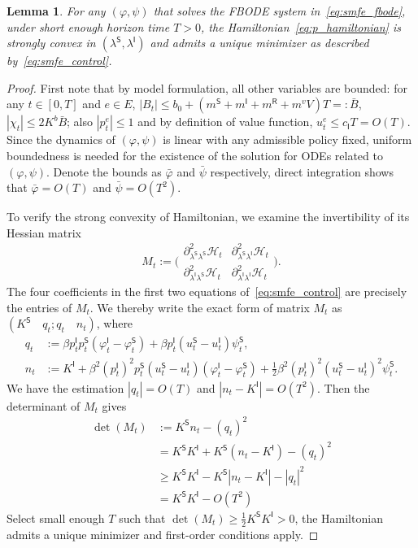\documentclass[letterpaper, 10 pt, conference]{ieeeconf}  %
\def\sS{\mathsf{S}}
\def\sI{\mathsf{I}}
\def\sR{\mathsf{R}}
\newtheorem{lemma}[theorem]{Lemma}
\begin{document}
\begin{lemma}
    \label{lemma:h_convexity}
    For any $(\varphi, \psi)$ that solves the FBODE system in~\eqref{eq:smfe_fbode}, under short enough horizon time $T > 0$, the Hamiltonian~\eqref{eq:p_hamiltonian} is strongly convex in $(\lambda^\sS,\lambda^\sI)$ and admits a unique minimizer as described by~\eqref{eq:smfe_control}.
\end{lemma}
\begin{proof}
    First note that by model formulation, all other variables are bounded: for any $t \in [0,T]$ and $e \in E$, $|B_t| \leq b_0+(m^\sS+m^\sI+m^\sR+m^v V)T =: \bar{B}$, $|\chi_t| \leq 2 K^b \bar{B}$; also $|p_t^e| \leq 1$ and by definition of value function, $u_t^e \leq c_\sI T = O(T)$.  Since the dynamics of $(\varphi,\psi)$ is linear with any admissible policy fixed, uniform boundedness is needed for the existence of the solution for ODEs related to $(\varphi,\psi)$. Denote the bounds as $\bar\varphi$ and $\bar\psi$ respectively, direct integration shows that $\bar\varphi = O(T)$ and $\bar\psi = O(T^2)$.

    To verify the strong convexity of Hamiltonian, we examine the invertibility of its Hessian matrix
    \small $$M_t:=\bigg(\begin{array}{cc}
\partial^2_{\lambda^{\sS}\lambda^{\sS}} \mathcal{H}_t & \partial^2_{\lambda^{\sS}\lambda^{\sI}} \mathcal{H}_t \\
\partial^2_{\lambda^{\sI}\lambda^{\sS}} \mathcal{H}_t & \partial^2_{\lambda^{\sI}\lambda^{\sI}} \mathcal{H}_t
\end{array}\bigg).$$ \normalsize
The four coefficients in the first two equations of~\eqref{eq:smfe_control} are precisely the entries of $M_t$.
    We thereby write the exact form of matrix $M_t$ as $(K^\sS \quad q_t; q_t \quad n_t)$, where
    \small
    \begin{equation*}
        \begin{aligned}
            q_t &:= \beta p_t^\sI p_t^\sS(\varphi_t^\sI-\varphi_t^\sS)+\beta p_t^\sI(u_t^\sS-u_t^\sI) \psi_t^\sS, \\
            n_t &:= K^\sI + \beta^2 (p_t^\sI)^2 p_t^\sS (u_t^\sS-u_t^\sI)(\varphi_t^\sI-\varphi_t^\sS) +\frac{1}{2}\beta^2 (p_t^\sI)^2(u_t^\sS-u_t^\sI)^2 \psi_t^\sS.
        \end{aligned}
    \end{equation*}
    \normalsize
    We have the estimation $|q_t| = O(T)$ and $|n_t - K^\sI| = O(T^2)$. Then the determinant of $M_t$ gives
    \small
    \begin{equation*}
        \begin{aligned}
            \det(M_t)&:=K^\sS n_t - (q_t)^2 \\ &= K^\sS K^\sI + K^\sS (n_t - K^\sI) - (q_t)^2 \\ &\geq K^\sS K^\sI - K^\sS |n_t - K^\sI| - |q_t|^2 \\ & = K^\sS K^\sI - O(T^2)
        \end{aligned}
    \end{equation*}
    \normalsize
    Select small enough $T$ such that $\det(M_t) \geq \frac{1}{2}K^\sS K^\sI>0$, the Hamiltonian admits a unique minimizer and first-order conditions apply.
\end{proof}
\end{document}
